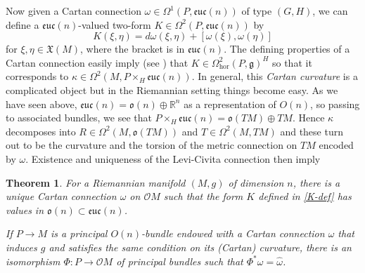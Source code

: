 \documentclass[12pt,a4paper]{amsart}
\def\frak{\mathfrak}
\def\Bbb{\mathbb}
\def\Cal{\mathcal}
\newcommand{\x}{\times}
\newcommand{\ka}{\kappa}
\newcommand{\om}{\omega}
\newcommand{\Ph}{\Phi}
\newcommand{\Om}{\Omega}
\newcommand{\euc}{\mathfrak{euc}}
\newcommand{\hor}{\text{hor}}
\newcounter{theorem}
\numberwithin{theorem}{section}
\numberwithin{equation}{section}
\newtheorem{thm}[theorem]{Theorem}
\theoremstyle{definition}
\theoremstyle{remark}
\begin{document}
Now given a Cartan connection $\om\in\Om^1(P,\euc(n))$ of type $(G,H)$, we can define
a $\euc(n)$-valued two-form $K\in\Om^2(P,\euc(n))$ by
\begin{equation}\label{K-def}
K(\xi,\eta)=d\om(\xi,\eta)+[\om(\xi),\om(\eta)] 
\end{equation}
for $\xi,\eta\in\frak X(M)$, where the bracket is in $\euc(n)$. The defining
properties of a Cartan connection easily imply (see \cite{Sharpe}) that
$K\in\Om^2_{\hor}(P,\frak g)^H$ so that it corresponds to
$\ka\in\Om^2(M,P\x_H\euc(n))$. In general, this \textit{Cartan curvature} is a
complicated object but in the Riemannian setting things become easy. As we have seen
above, $\euc(n)=\frak o(n)\oplus\Bbb R^n$ as a representation of $O(n)$, so passing
to associated bundles, we see that $P\x_H\euc(n)=\frak o(TM)\oplus TM$. Hence $\ka$
decomposes into $R\in\Om^2(M,\frak o(TM))$ and $T\in\Om^2(M,TM)$ and these turn out
to be the curvature and the torsion of the metric connection on $TM$ encoded by
$\om$. Existence and uniqueness of the Levi-Civita connection then imply

\begin{thm}\label{thm3.2}
For a Riemannian manifold $(M,g)$ of dimension $n$, there is a unique Cartan
connection $\om$ on $\Cal OM$ such that the form $K$ defined in \eqref{K-def} has
values in $\frak o(n)\subset\euc(n)$.

If $P\to M$ is a principal $O(n)$-bundle endowed with a Cartan connection
$\widehat{\om}$ that induces $g$ and satisfies the same condition on its (Cartan)
curvature, there is an isomorphism $\Ph:P\to\Cal OM$ of principal bundles such that
$\Ph^*\om=\widehat{\om}$.
\end{thm}
\end{document}
